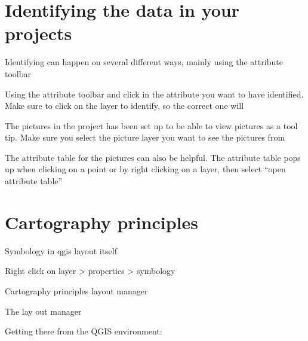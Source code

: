 \documentclass[letterpaper,10pt,english]{sphinxmanual}
\begin{document}
\chapter{Identifying the data in your projects}
\label{\detokenize{04_data_search:identifying-the-data-in-your-projects}}\label{\detokenize{04_data_search::doc}}
\sphinxAtStartPar
Identifying can happen on several different ways, mainly using the attribute toolbar



\sphinxAtStartPar
Using the attribute toolbar and click in the attribute you want to have identified. Make sure to click on the layer to identify, so the correct one will

\sphinxAtStartPar
The pictures in the project has been set up to be able to view pictures as a tool tip. Make sure you select the picture layer you want to see the pictures from

\sphinxAtStartPar
The attribute table for the pictures can also be helpful. The attribute table pops up when clicking on a point or by right clicking on a layer, then select “open attribute table”


\chapter{Cartography principles}
\label{\detokenize{05_cartography:cartography-principles}}\label{\detokenize{05_cartography::doc}}
\sphinxAtStartPar
Symbology in qgis lay\sphinxhyphen{}out itself

\sphinxAtStartPar
Right click on layer \sphinxhyphen{}\textgreater{} properties \sphinxhyphen{}\textgreater{} symbology

\sphinxAtStartPar
Cartography principles
layout manager

\sphinxAtStartPar
The lay out manager

\sphinxAtStartPar
Getting there from the QGIS environment:
\end{document}
